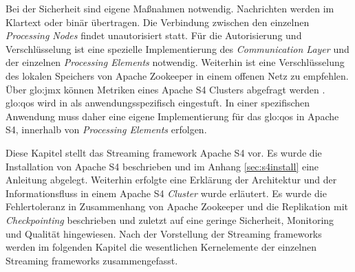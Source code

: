 Bei der Sicherheit sind eigene Maßnahmen notwendig. Nachrichten werden im Klartext oder binär übertragen. Die Verbindung zwischen den einzelnen \textit{Processing Nodes} findet unautorisiert statt. Für die Autorisierung und Verschlüsselung ist eine spezielle Implementierung des \textit{Communication Layer} und der einzelnen \textit{Processing Elements} notwendig. Weiterhin ist eine Verschlüsselung des lokalen Speichers von Apache Zookeeper in einem offenen Netz zu empfehlen. Über \gls{glo:jmx} können Metriken eines Apache S4 Clusters abgefragt werden . \gls{glo:qos} wird in  als anwendungsspezifisch eingestuft. In einer spezifischen Anwendung muss daher eine eigene Implementierung für das \gls{glo:qos} in Apache S4, innerhalb von \textit{Processing Elements} erfolgen.


Diese Kapitel stellt das Streaming framework Apache S4 vor. Es wurde die Installation von Apache S4 beschrieben und im Anhang \ref{sec:s4install} eine Anleitung abgelegt. Weiterhin erfolgte eine Erklärung der Architektur und der Informationsfluss in einem Apache S4 \textit{Cluster} wurde erläutert. Es wurde die Fehlertoleranz in Zusammenhang von Apache Zookeeper und die Replikation mit \textit{Checkpointing} beschrieben und zuletzt auf eine geringe Sicherheit, Monitoring und Qualität hingewiesen. Nach der Vorstellung der Streaming frameworks werden im folgenden Kapitel die wesentlichen Kernelemente der einzelnen Streaming frameworks zusammengefasst.